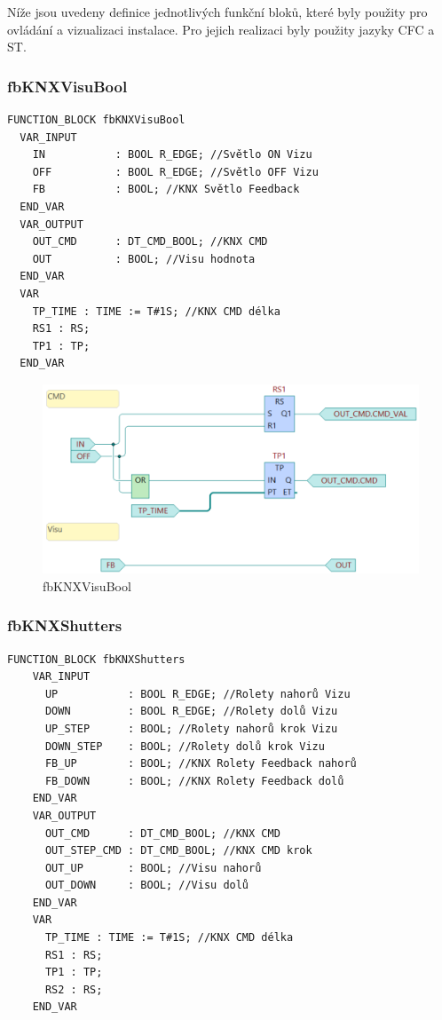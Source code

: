 \noindent Níže jsou uvedeny definice jednotlivých funkční bloků, které byly použity pro ovládání a vizualizaci instalace. Pro jejich realizaci byly použity jazyky CFC a ST.

\subsubsection{fbKNXVisuBool}
\begin{lstlisting}[language=ST]
FUNCTION_BLOCK fbKNXVisuBool
  VAR_INPUT
    IN           : BOOL R_EDGE; //Světlo ON Vizu
    OFF          : BOOL R_EDGE; //Světlo OFF Vizu
    FB           : BOOL; //KNX Světlo Feedback
  END_VAR
  VAR_OUTPUT
    OUT_CMD      : DT_CMD_BOOL; //KNX CMD
    OUT          : BOOL; //Visu hodnota
  END_VAR
  VAR
    TP_TIME : TIME := T#1S; //KNX CMD délka
    RS1 : RS;
    TP1 : TP;
  END_VAR

\end{lstlisting}

\begin{figure}[!ht]
    \begin{center}
        \includegraphics[scale=0.5]{obrazky/fbKNXVisuBool.png}
    \end{center}
    \caption[fbKNXVisuBool]{fbKNXVisuBool}
    \label{fig:fbKNXVisuBool}
\end{figure}
\newpage
\subsubsection{fbKNXShutters}
\begin{lstlisting}[language=ST]
    FUNCTION_BLOCK fbKNXShutters
    VAR_INPUT
      UP           : BOOL R_EDGE; //Rolety nahorů Vizu
      DOWN         : BOOL R_EDGE; //Rolety dolů Vizu
      UP_STEP      : BOOL; //Rolety nahorů krok Vizu
      DOWN_STEP    : BOOL; //Rolety dolů krok Vizu
      FB_UP        : BOOL; //KNX Rolety Feedback nahorů
      FB_DOWN      : BOOL; //KNX Rolety Feedback dolů
    END_VAR
    VAR_OUTPUT
      OUT_CMD      : DT_CMD_BOOL; //KNX CMD
      OUT_STEP_CMD : DT_CMD_BOOL; //KNX CMD krok
      OUT_UP       : BOOL; //Visu nahorů
      OUT_DOWN     : BOOL; //Visu dolů
    END_VAR
    VAR
      TP_TIME : TIME := T#1S; //KNX CMD délka
      RS1 : RS;
      TP1 : TP;
      RS2 : RS;
    END_VAR
\end{lstlisting}

